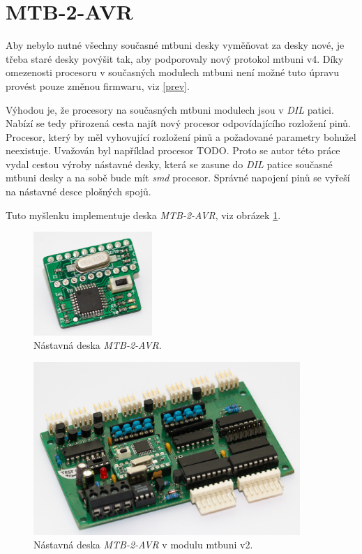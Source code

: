 \section{MTB-2-AVR} \label{sec:mtb-2-avr}

Aby nebylo nutné všechny současné \gls{mtbuni} desky vyměňovat za desky nové,
je třeba staré desky povýšit tak, aby podporovaly nový protokol \gls{mtbuni} v4.
Díky omezenosti procesoru v současných modulech \gls{mtbuni} není možné tuto
úpravu provést pouze změnou firmwaru, viz \ref{prev}.

Výhodou je, že procesory na současných \gls{mtbuni} modulech jsou v
\textit{DIL} patici. Nabízí se tedy přirozená cesta najít nový procesor
odpovídajícího rozložení pinů. Procesor, který by měl vyhovující rozložení pinů
a požadované parametry bohužel neexistuje. Uvažován byl například procesor
TODO. Proto se autor této práce vydal cestou výroby nástavné desky, která se
zasune do \textit{DIL} patice současné \gls{mtbuni} desky a na sobě bude mít
\textit{smd} procesor.  Správné napojení pinů se vyřeší na nástavné desce
plošných spojů.

Tuto myšlenku implementuje deska \textit{MTB-2-AVR}, viz obrázek
\ref{fig:mtb-2-avr-alone}.

\begin{figure}[ht]
\includegraphics[width=0.4\textwidth]{data/uni-2-upgrade-alone.jpg}
\caption{Nástavná deska \textit{MTB-2-AVR}.}
\label{fig:mtb-2-avr-alone}
\end{figure}

\begin{figure}[ht]
\includegraphics[width=0.9\textwidth]{data/uni-2-upgrade-all.jpg}
\caption{Nástavná deska \textit{MTB-2-AVR} v modulu \gls{mtbuni} v2.}
\label{fig:mtb-2-avr-inside}
\end{figure}

